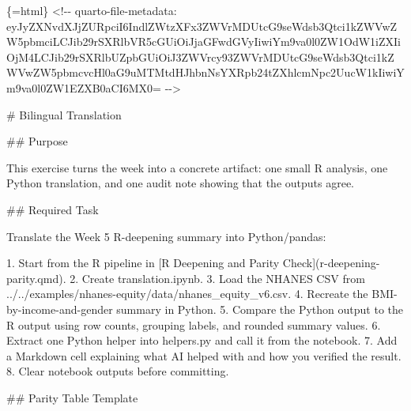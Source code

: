\documentclass[
  letterpaper,
  DIV=11,
  numbers=noendperiod,
  oneside]{scrreprt}
\newenvironment{Shaded}{\begin{snugshade}}{\end{snugshade}}
\newcommand{\CommentTok}[1]{\textcolor[rgb]{0.37,0.37,0.37}{#1}}
\newcommand{\FunctionTok}[1]{\textcolor[rgb]{0.28,0.35,0.67}{#1}}
\newcommand{\InformationTok}[1]{\textcolor[rgb]{0.37,0.37,0.37}{#1}}
\newcommand{\NormalTok}[1]{\textcolor[rgb]{0.00,0.23,0.31}{#1}}
\newcommand{\OtherTok}[1]{\textcolor[rgb]{0.00,0.23,0.31}{#1}}
\newcommand{\SpecialStringTok}[1]{\textcolor[rgb]{0.13,0.47,0.30}{#1}}
\begin{document}
\begin{Shaded}
\begin{Highlighting}[numbers=left,,]
\InformationTok{\textasciigrave{}\textasciigrave{}\textasciigrave{}\{=html\}}
\InformationTok{\textless{}!{-}{-} quarto{-}file{-}metadata: eyJyZXNvdXJjZURpciI6IndlZWtzXFx3ZWVrMDUtcG9seWdsb3Qtci1kZWVwZW5pbmciLCJib29rSXRlbVR5cGUiOiJjaGFwdGVyIiwiYm9va0l0ZW1OdW1iZXIiOjM4LCJib29rSXRlbUZpbGUiOiJ3ZWVrcy93ZWVrMDUtcG9seWdsb3Qtci1kZWVwZW5pbmcvcHl0aG9uMTMtdHJhbnNsYXRpb24tZXhlcmNpc2UucW1kIiwiYm9va0l0ZW1EZXB0aCI6MX0= {-}{-}\textgreater{}}
\InformationTok{\textasciigrave{}\textasciigrave{}\textasciigrave{}}

\FunctionTok{\# Bilingual Translation }


\FunctionTok{\#\# Purpose}

\NormalTok{This exercise turns the week into a concrete artifact: one small R analysis, one Python translation, and one audit note showing that the outputs agree.}

\FunctionTok{\#\# Required Task}

\NormalTok{Translate the Week 5 R{-}deepening summary into Python/pandas:}

\SpecialStringTok{1. }\NormalTok{Start from the R pipeline in }\CommentTok{[}\OtherTok{R Deepening and Parity Check}\CommentTok{](r{-}deepening{-}parity.qmd)}\NormalTok{.}
\SpecialStringTok{2. }\NormalTok{Create }\InformationTok{\textasciigrave{}translation.ipynb\textasciigrave{}}\NormalTok{.}
\SpecialStringTok{3. }\NormalTok{Load the NHANES CSV from }\InformationTok{\textasciigrave{}../../examples/nhanes{-}equity/data/nhanes\_equity\_v6.csv\textasciigrave{}}\NormalTok{.}
\SpecialStringTok{4. }\NormalTok{Recreate the BMI{-}by{-}income{-}and{-}gender summary in Python.}
\SpecialStringTok{5. }\NormalTok{Compare the Python output to the R output using row counts, grouping labels, and rounded summary values.}
\SpecialStringTok{6. }\NormalTok{Extract one Python helper into }\InformationTok{\textasciigrave{}helpers.py\textasciigrave{}}\NormalTok{ and call it from the notebook.}
\SpecialStringTok{7. }\NormalTok{Add a Markdown cell explaining what AI helped with and how you verified the result.}
\SpecialStringTok{8. }\NormalTok{Clear notebook outputs before committing.}

\FunctionTok{\#\# Parity Table Template}


\end{Highlighting}
\end{Shaded}
\end{document}
